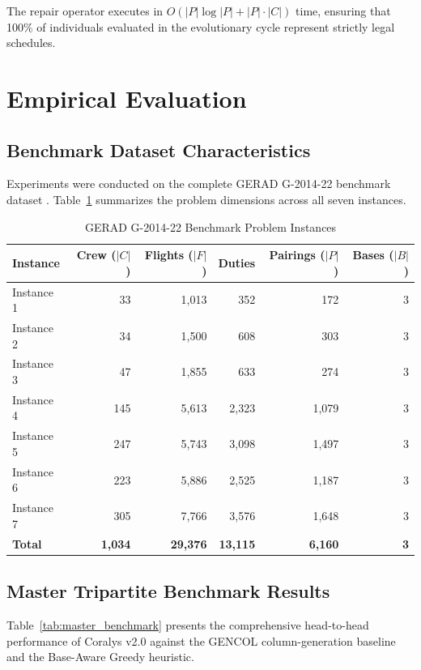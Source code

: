 \documentclass[journal]{IEEEtran}
\begin{document}
The repair operator executes in $O(|P| \log |P| + |P| \cdot |C|)$ time, ensuring that 100\% of individuals evaluated in the evolutionary cycle represent strictly legal schedules.

\section{Empirical Evaluation}

\subsection{Benchmark Dataset Characteristics}

Experiments were conducted on the complete GERAD G-2014-22 benchmark dataset \cite{kasirzadeh2017}. Table~\ref{tab:dataset} summarizes the problem dimensions across all seven instances.

\begin{table}[htbp]
\caption{GERAD G-2014-22 Benchmark Problem Instances}
\label{tab:dataset}
\centering
\begin{tabular}{lrrrrr}
\toprule
Instance & Crew ($|C|$) & Flights ($|F|$) & Duties & Pairings ($|P|$) & Bases ($|B|$) \\
\midrule
Instance 1 & 33 & 1,013 & 352 & 172 & 3 \\
Instance 2 & 34 & 1,500 & 608 & 303 & 3 \\
Instance 3 & 47 & 1,855 & 633 & 274 & 3 \\
Instance 4 & 145 & 5,613 & 2,323 & 1,079 & 3 \\
Instance 5 & 247 & 5,743 & 3,098 & 1,497 & 3 \\
Instance 6 & 223 & 5,886 & 2,525 & 1,187 & 3 \\
Instance 7 & 305 & 7,766 & 3,576 & 1,648 & 3 \\
\midrule
\textbf{Total} & \textbf{1,034} & \textbf{29,376} & \textbf{13,115} & \textbf{6,160} & \textbf{3} \\
\bottomrule
\end{tabular}
\end{table}

\subsection{Master Tripartite Benchmark Results}

Table~\ref{tab:master_benchmark} presents the comprehensive head-to-head performance of Coralys v2.0 against the GENCOL column-generation baseline \cite{kasirzadeh2017} and the Base-Aware Greedy heuristic.
\end{document}
